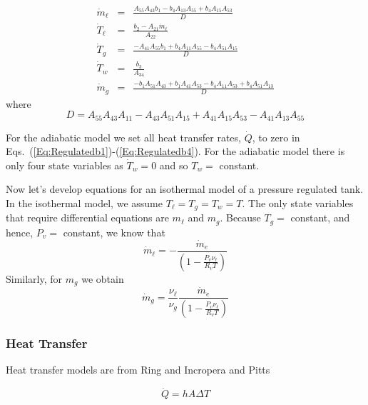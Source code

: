 \begin{eqnarray}
   \dot{m}_\ell &=& \frac{A_{55} A_{43} b_1 - b_4 A_{13} A_{55} + b_4 A_{15} A_{53}}{D}\\
   \dot{T}_\ell &=& \frac{b_2 - A_{21}\dot{m}_\ell}{A_{22}}\\
   \dot{T}_g  &=& \frac{-A_{41} A_{55} b_1 + b_4 A_{11} A_{55} - b_4 A_{51}
    A_{15}}{D}\\
   \dot{T}_w &=& \frac{b_3}{A_{34}}\\
   \dot{m}_g &=& \frac{-b_1 A_{51} A_{43} + b_1 A_{41} A_{53} - b_4 A_{11} A_{53} + b_4 A_{51} A_{13}}{D}
\end{eqnarray}
%
where
%
\begin{equation}
      D = A_{55} A_{43} A_{11} - A_{43} A_{51} A_{15} + A_{41} A_{15} A_{53} - A_{41} A_{13} A_{55}
\end{equation}

For the adiabatic model we set all heat transfer rates, $\dot{Q}$,
to zero in  Eqs.~(\ref{Eq:Regulatedb1})-(\ref{Eq:Regulatedb4}). For
the adiabatic model there is only four state variables as $\dot{T}_w
= 0$ and so $T_w =$ constant.

Now let's develop equations for an isothermal model of a pressure
regulated tank. In the isothermal model, we assume $T_\ell = T_g =
T_w = T$. The only state variables that require differential
equations are $m_\ell$ and $m_g$. Because $T_g =$ constant, and
hence, $P_v =$ constant, we know that
%
\begin{equation}
    \dot{m}_\ell = -\frac{\dot{m}_e}{\left( 1 - \displaystyle\frac{P_v \nu_\ell}{R_v
    T}\right)}
\end{equation}
%
Similarly, for $m_g$ we obtain
%
\begin{equation}
   \dot{m}_g = \frac{\nu_\ell}{\nu_g}\frac{\dot{m}_e}{\left( 1 - \displaystyle\frac{P_v \nu_\ell}{R_v
    T}\right)}
\end{equation}

\subsubsection{Heat Transfer}

Heat transfer models are from Ring\cite{Ring:64} and
Incropera\cite{Incropera:06} and Pitts\cite{Pitts:98}

\begin{equation}
    \dot{Q} = h A \Delta T
\end{equation}

